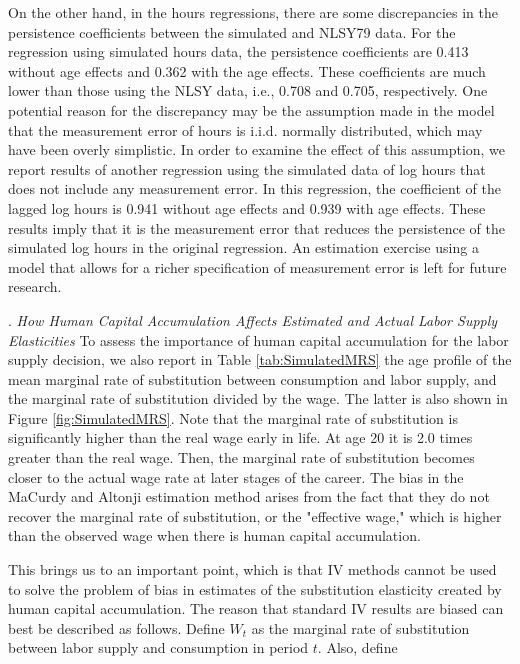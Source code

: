 \documentclass[\econtexRoot/ImaiKeane]{subfiles}
\begin{document}
      On the other hand, in the hours regressions, there are some discrepancies in the persistence coefficients between the simulated and NLSY79 data. For the  regression using simulated hours data, the persistence coefficients are 0.413 without age effects and 0.362 with the age effects. These coefficients are much lower than those using the NLSY data, i.e., 0.708 and 0.705, respectively. One potential reason for the discrepancy may be the assumption made in the model that the measurement error of hours is i.i.d. normally distributed, which may have been overly simplistic. In order to examine the effect of this assumption, we report results of another regression using the simulated data of log hours that does not include any measurement error. In this regression, the coefficient of the lagged log hours is 0.941 without age effects and 0.939 with age effects. These results imply that it is the measurement error that reduces the persistence of the simulated log hours in the original regression. An estimation exercise using a model that allows for a richer specification of measurement error is left for future research. \par
{}.     \textit{How Human Capital Accumulation Affects Estimated and Actual Labor Supply Elasticities}     To assess the importance of human capital accumulation for the labor supply decision, we also report in Table \ref{tab:SimulatedMRS} the age profile of the mean marginal rate of substitution between consumption and labor supply, and the marginal rate of substitution divided by the wage. The latter is also shown in Figure \ref{fig:SimulatedMRS}. Note that the marginal rate of substitution is significantly higher than the real wage early in life. At age 20 it is 2.0 times greater than the real wage. Then, the marginal rate of substitution becomes closer to the actual wage rate at later stages of the career. The bias in the MaCurdy and Altonji estimation method arises from the fact that they do not recover the marginal rate of substitution, or the "effective wage," which is higher than the observed wage when there is human capital accumulation. \par
     
      
      This brings us to an important point, which is that IV methods cannot be used to solve the problem of bias in estimates of the substitution elasticity created by human capital accumulation. The reason that standard IV results are biased can best be described as follows. Define $W_t$ as the marginal rate of substitution between labor supply and consumption in period $t$. Also, define
\end{document}
